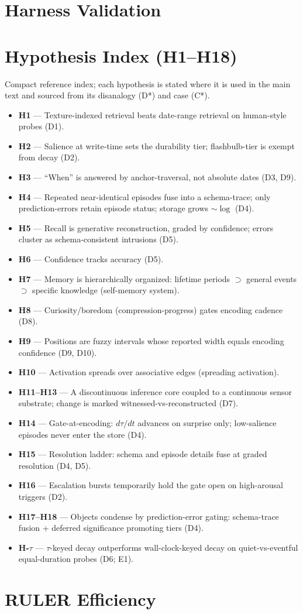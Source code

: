 \documentclass[letterpaper]{article}
\begin{document}
\appendix
\section{Harness Validation}\label{app:harness}

\section{Hypothesis Index (H1--H18)}\label{app:hyps}
Compact reference index; each hypothesis is stated where it is used in the main text and sourced from its disanalogy (D*) and case (C*).
\begin{itemize}\small
\item \textbf{H1} --- Texture-indexed retrieval beats date-range retrieval on human-style probes (D1).
\item \textbf{H2} --- Salience at write-time sets the durability tier; flashbulb-tier is exempt from decay (D2).
\item \textbf{H3} --- ``When'' is answered by anchor-traversal, not absolute dates (D3, D9).
\item \textbf{H4} --- Repeated near-identical episodes fuse into a schema-trace; only prediction-errors retain episode status; storage grows $\sim\log$ (D4).
\item \textbf{H5} --- Recall is generative reconstruction, graded by confidence; errors cluster as schema-consistent intrusions (D5).
\item \textbf{H6} --- Confidence tracks accuracy (D5).
\item \textbf{H7} --- Memory is hierarchically organized: lifetime periods $\supset$ general events $\supset$ specific knowledge (self-memory system).
\item \textbf{H8} --- Curiosity/boredom (compression-progress) gates encoding cadence (D8).
\item \textbf{H9} --- Positions are fuzzy intervals whose reported width equals encoding confidence (D9, D10).
\item \textbf{H10} --- Activation spreads over associative edges (spreading activation).
\item \textbf{H11--H13} --- A discontinuous inference core coupled to a continuous sensor substrate; change is marked witnessed-vs-reconstructed (D7).
\item \textbf{H14} --- Gate-at-encoding: $d\tau/dt$ advances on surprise only; low-salience episodes never enter the store (D4).
\item \textbf{H15} --- Resolution ladder: schema and episode details fuse at graded resolution (D4, D5).
\item \textbf{H16} --- Escalation bursts temporarily hold the gate open on high-arousal triggers (D2).
\item \textbf{H17--H18} --- Objects condense by prediction-error gating: schema-trace fusion + deferred significance promoting tiers (D4).
\item \textbf{H-$\tau$} --- $\tau$-keyed decay outperforms wall-clock-keyed decay on quiet-vs-eventful equal-duration probes (D6; E1).
\end{itemize}
\section{RULER Efficiency}\label{app:ruler}

\end{document}
